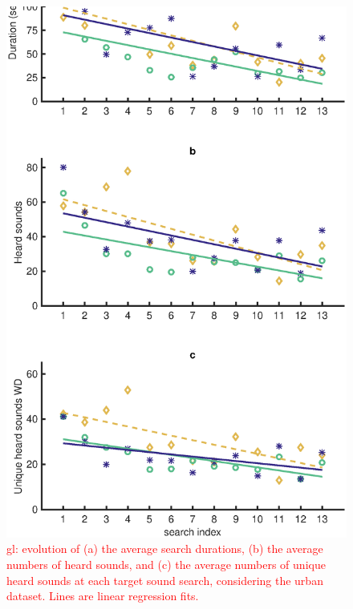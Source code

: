 \documentclass{aes2e}
\newcommand{\gl}[1]{\textcolor{red}{gl: #1}}
\begin{document}
\begin{figure}[t]
\begin{center}
\includegraphics[width=\columnwidth]{gfx/analyse_urban2.eps} 
\end{center}
\caption{\label{fig2urban} \gl{evolution of (a) the average search durations, (b) the average numbers of heard sounds, and (c) the average numbers of unique heard sounds at each target sound search, considering the urban dataset. Lines are linear regression fits.}}
\end{figure}
\end{document}
